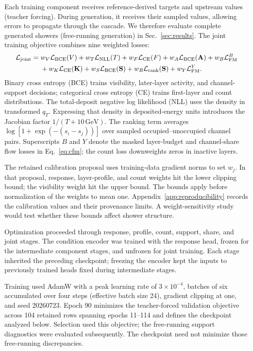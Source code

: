 \documentclass[11pt]{article}
\newcommand{\GeV}{\,\mathrm{GeV}}
\begin{document}
Each training component receives reference-derived targets and upstream values (teacher forcing). During generation, it receives their sampled values, allowing errors to propagate through the cascade. We therefore evaluate complete generated showers (free-running generation) in Sec.~\ref{sec:results}. The joint training objective combines nine weighted losses:
\begin{equation}
 \begin{aligned}
 \mathcal L_{\rm joint}={}&w_V\mathcal L_{\rm BCE}(V)
 +w_T\mathcal L_{\rm NLL}(T)
 +w_F\mathcal L_{\rm CE}(F)
 +w_A\mathcal L_{\rm BCE}(\mathbf A)
 +w_B\mathcal L_{\rm FM}^{B}\\
 &+w_K\mathcal L_{\rm CE}(\mathbf K)
 +w_S\mathcal L_{\rm BCE}(\mathbf S)
 +w_R\mathcal L_{\rm rank}(\mathbf S)
 +w_Y\mathcal L_{\rm FM}^{Y}.
 \end{aligned}
 \label{eq:joint_loss}
\end{equation}
Binary cross entropy (BCE) trains visibility, later-layer activity, and channel-support decisions; categorical cross entropy (CE) trains first-layer and count distributions. The total-deposit negative log likelihood (NLL) uses the density in transformed $q_T$. Expressing that density in deposited-energy units introduces the Jacobian factor $1/(T+10\GeV)$. The ranking term averages $\log[1+\exp(-(s_i-s_j))]$ over sampled occupied--unoccupied channel pairs. Superscripts $B$ and $Y$ denote the masked layer-budget and channel-share flow losses in Eq.~\eqref{eq:cfm}; the count loss downweights zeros in inactive layers.

The retained calibration proposal uses training-data gradient norms to set $w_j$. In that proposal, response, layer-profile, and count weights hit the lower clipping bound; the visibility weight hit the upper bound. The bounds apply before normalization of the weights to mean one. Appendix~\ref{app:reproducibility} records the calibration values and their provenance limits. A weight-sensitivity study would test whether these bounds affect shower structure.

Optimization proceeded through response, profile, count, support, share, and joint stages. The condition encoder was trained with the response head, frozen for the intermediate component stages, and unfrozen for joint training. Each stage inherited the preceding checkpoint; freezing the encoder kept the inputs to previously trained heads fixed during intermediate stages.

Training used AdamW with a peak learning rate of $3\times10^{-4}$, batches of six accumulated over four steps (effective batch size 24), gradient clipping at one, and seed 20260723. Epoch 90 minimizes the teacher-forced validation objective across 104 retained rows spanning epochs 11--114 and defines the checkpoint analyzed below. Selection used this objective; the free-running support diagnostics were evaluated subsequently. The checkpoint need not minimize those free-running discrepancies.
\end{document}
